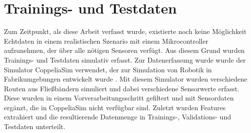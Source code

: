 \chapter{Trainings- und Testdaten}
Zum Zeitpunkt, als diese Arbeit verfasst wurde, existierte noch keine Möglichkeit Echtdaten in einem
realistischen Szenario mit einem Mikrocontroller aufzunehmen, der über alle nötigen Sensoren verfügt.
Aus diesem Grund wurden Trainings- und Testdaten simulativ erfasst.
\newline
\newline
Zur Datenerfassung wurde wurde der Simulator CoppeliaSim verwendet, der zur Simulation von Robotik in Fabrikumgebungen entwickelt wurde \cite{coppeliaSim}.
Mit diesem Simulator wurden verschiedene Routen aus Fließbändern simuliert und dabei verschiedene Sensorwerte erfasst.
Diese wurden in einem Vorverarbeitungsschritt gefiltert und mit Sensordaten ergänzt, die in CoppeliaSim nicht verfügbar sind.
Zuletzt wurden Features extrahiert und die resultierende Datenmenge in Trainings-, Validations- und Testdaten unterteilt.






